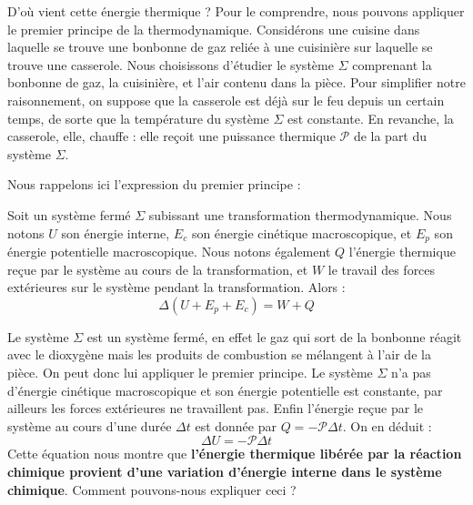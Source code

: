 \documentclass[11pt,fleqn]{book} %
\begin{document}
D'où vient cette énergie thermique ? Pour le comprendre, nous pouvons appliquer le premier principe de la thermodynamique. Considérons une cuisine dans laquelle se trouve une bonbonne de gaz reliée à une cuisinière sur laquelle se trouve une casserole. Nous choisissons d'étudier le système $\Sigma$ comprenant la bonbonne de gaz, la cuisinière, et l'air contenu dans la pièce. Pour simplifier notre raisonnement, on suppose que la casserole est déjà sur le feu depuis un certain temps, de sorte que la température du système $\Sigma$ est constante. En revanche, la casserole, elle, chauffe : elle reçoit une puissance thermique $\mathcal{P}$ de la part du système $\Sigma$.

Nous rappelons ici l'expression du premier principe :
\begin{theorem}
    Soit un système fermé $\Sigma$ subissant une transformation thermodynamique. Nous notons $U$ son énergie interne, $E_c$ son énergie cinétique macroscopique, et   $E_p$ son énergie potentielle macroscopique. Nous notons également $Q$ l'énergie thermique reçue par le système au cours de la transformation, et $W$ le travail des forces extérieures sur le système pendant la transformation. Alors :
    \begin{equation}
        \Delta(U+E_p+E_c) = W + Q
    \end{equation}
\end{theorem}


Le système $\Sigma$ est un système fermé, en effet le gaz qui sort de la bonbonne réagit avec le dioxygène mais les produits de combustion se mélangent à l'air de la pièce. On peut donc lui appliquer le premier principe. Le système $\Sigma$ n'a pas d'énergie cinétique macroscopique et son énergie potentielle est constante, par ailleurs les forces extérieures ne travaillent pas. Enfin l'énergie reçue par le système au cours d'une durée $\Delta t$ est donnée par $Q = -\mathcal{P} \Delta t$. On en déduit :
\begin{equation}
    \Delta U = - \mathcal{P} \Delta t
\end{equation}
Cette équation nous montre que \textbf{l'énergie thermique libérée par la réaction chimique provient d'une variation d'énergie interne dans le système chimique}. Comment pouvons-nous expliquer ceci ?
\end{document}
